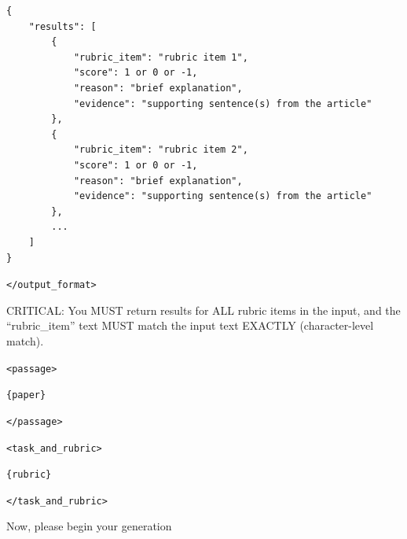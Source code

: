 \documentclass[11pt]{article}
\begin{document}
\begin{tcolorbox}[breakable, colback=gray!5!white, colframe=gray!75!black, left=6pt, right=6pt, top=6pt, bottom=6pt, fontupper=\small]
\begin{lstlisting}[basicstyle=\ttfamily\footnotesize, breaklines=true, frame=none, numbers=none]
{
    "results": [
        {
            "rubric_item": "rubric item 1",
            "score": 1 or 0 or -1,
            "reason": "brief explanation",
            "evidence": "supporting sentence(s) from the article"
        },
        {
            "rubric_item": "rubric item 2",
            "score": 1 or 0 or -1,
            "reason": "brief explanation",
            "evidence": "supporting sentence(s) from the article"
        },
        ...
    ]
}
\end{lstlisting}

\texttt{</output\_format>}

CRITICAL: You MUST return results for ALL rubric items in the input, and the ``rubric\_item'' text MUST match the input text EXACTLY (character-level match).

\texttt{<passage>}

\texttt{\{paper\}}

\texttt{</passage>}

\texttt{<task\_and\_rubric>}

\texttt{\{rubric\}}

\texttt{</task\_and\_rubric>}

Now, please begin your generation

\end{tcolorbox}
\end{document}
